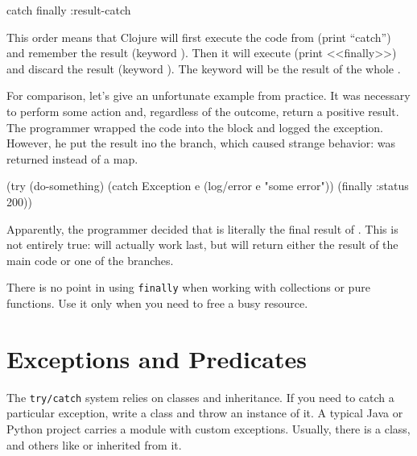 \begin{english}
  \begin{clojure}
catch
finally
:result-catch
  \end{clojure}
\end{english}

This order means that Clojure will first execute the code from  (print ``catch'') and remember the result (keyword ). Then it will execute  (print <<finally>>) and discard the result (keyword ). The  keyword will be the result of the whole .

For comparison, let's give an unfortunate example from practice. It was necessary to perform some action and, regardless of the outcome, return a positive result. The programmer wrapped the code into the  block and logged the exception. However, he put the result ino the  branch, which caused strange behavior:  was returned instead of a map.

\begin{english}
  \begin{clojure}
(try
  (do-something)
  (catch Exception e
    (log/error e "some error"))
  (finally
    {:status 200}))
  \end{clojure}
\end{english}

Apparently, the programmer decided that  is literally the final result of . This is not entirely true:  will actually work last, but  will return either the result of the main code or one of the  branches.

There is no point in using \verb|finally| when working with collections or pure functions. Use it only when you need to free a busy resource.

\section{Exceptions and Predicates}


The \verb|try/catch| system relies on classes and inheritance. If you need to catch a particular exception, write a class and throw an instance of it. A typical Java or Python project carries a module with custom exceptions. Usually, there is a  class, and others like  or  inherited from it.

